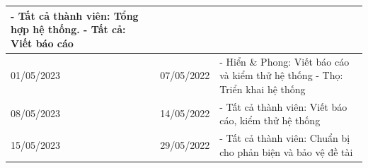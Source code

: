 {\begin{longtable}{| p{2cm} | p{2cm} | p{10cm} |}
	  - Tất cả thành viên: Tổng hợp hệ thống.
	  \newline
	  - Tất cả: Viết báo cáo                                                                           \\
	  \hline
	  01/05/2023       & 07/05/2022   &
	  - Hiển           \& Phong: Viết báo cáo và kiểm thử hệ thống
	  \newline
	  - Thọ: Triển khai hệ thống                                                                       \\
	  \hline
	  08/05/2023       & 14/05/2022   &
	  - Tất cả thành viên: Viết báo cáo, kiểm thử hệ thống                                             \\
	  \hline
	  15/05/2023       & 29/05/2022   &
	  - Tất cả thành viên: Chuẩn bị cho phản biện và bảo vệ đề tài                                     \\
	  \hline
  \end{longtable}

 }
